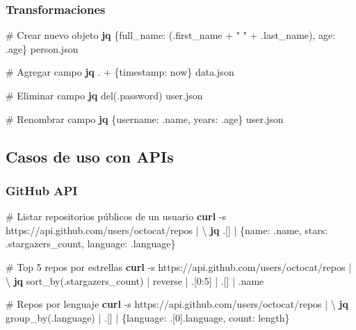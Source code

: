 \documentclass[
  11pt,
  letterpaper,
  oneside,
  openany]{scrbook}
\newenvironment{Shaded}{}{}
\newcommand{\AttributeTok}[1]{\textcolor[rgb]{0.84,0.23,0.29}{#1}}
\newcommand{\CommentTok}[1]{\textcolor[rgb]{0.42,0.45,0.49}{#1}}
\newcommand{\DataTypeTok}[1]{\textcolor[rgb]{0.84,0.23,0.29}{#1}}
\newcommand{\ExtensionTok}[1]{\textcolor[rgb]{0.84,0.23,0.29}{\textbf{#1}}}
\newcommand{\KeywordTok}[1]{\textcolor[rgb]{0.84,0.23,0.29}{#1}}
\newcommand{\NormalTok}[1]{\textcolor[rgb]{0.14,0.16,0.18}{#1}}
\newcommand{\StringTok}[1]{\textcolor[rgb]{0.01,0.18,0.38}{#1}}
\begin{document}
\subsubsection{Transformaciones}\label{transformaciones}

\begin{Shaded}
\begin{Highlighting}[]
\CommentTok{\# Crear nuevo objeto}
\ExtensionTok{jq} \StringTok{\textquotesingle{}\{full\_name: (.first\_name + " " + .last\_name), age: .age\}\textquotesingle{}}\NormalTok{ person.json}

\CommentTok{\# Agregar campo}
\ExtensionTok{jq} \StringTok{\textquotesingle{}. + \{timestamp: now\}\textquotesingle{}}\NormalTok{ data.json}

\CommentTok{\# Eliminar campo}
\ExtensionTok{jq} \StringTok{\textquotesingle{}del(.password)\textquotesingle{}}\NormalTok{ user.json}

\CommentTok{\# Renombrar campo}
\ExtensionTok{jq} \StringTok{\textquotesingle{}\{username: .name, years: .age\}\textquotesingle{}}\NormalTok{ user.json}
\end{Highlighting}
\end{Shaded}

\subsection{Casos de uso con APIs}\label{casos-de-uso-con-apis}

\subsubsection{GitHub API}\label{github-api}

\begin{Shaded}
\begin{Highlighting}[]
\CommentTok{\# Listar repositorios públicos de un usuario}
\ExtensionTok{curl} \AttributeTok{{-}s}\NormalTok{ https://api.github.com/users/octocat/repos }\KeywordTok{|} \DataTypeTok{\textbackslash{}}
\ExtensionTok{jq} \StringTok{\textquotesingle{}.[] | \{name: .name, stars: .stargazers\_count, language: .language\}\textquotesingle{}}

\CommentTok{\# Top 5 repos por estrellas}
\ExtensionTok{curl} \AttributeTok{{-}s}\NormalTok{ https://api.github.com/users/octocat/repos }\KeywordTok{|} \DataTypeTok{\textbackslash{}}
\ExtensionTok{jq} \StringTok{\textquotesingle{}sort\_by(.stargazers\_count) | reverse | .[0:5] | .[] | .name\textquotesingle{}}

\CommentTok{\# Repos por lenguaje}
\ExtensionTok{curl} \AttributeTok{{-}s}\NormalTok{ https://api.github.com/users/octocat/repos }\KeywordTok{|} \DataTypeTok{\textbackslash{}}
\ExtensionTok{jq} \StringTok{\textquotesingle{}group\_by(.language) | .[] | \{language: .[0].language, count: length\}\textquotesingle{}}
\end{Highlighting}
\end{Shaded}
\end{document}
